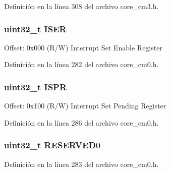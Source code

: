 Definición en la línea 308 del archivo core\+\_\+cm3.\+h.

\subsubsection[{\texorpdfstring{I\+S\+ER}{ISER}}]{ uint32\+\_\+t I\+S\+ER}\hypertarget{struct_n_v_i_c___type_a95686b1da7037feece357d91ba5f5325}{}\label{struct_n_v_i_c___type_a95686b1da7037feece357d91ba5f5325}
Offset\+: 0x000 (R/W) Interrupt Set Enable Register 

Definición en la línea 282 del archivo core\+\_\+cm0.\+h.

\subsubsection[{\texorpdfstring{I\+S\+PR}{ISPR}}]{ uint32\+\_\+t I\+S\+PR}\hypertarget{struct_n_v_i_c___type_ae3434eff1b1db4ce857c73a4ef1af273}{}\label{struct_n_v_i_c___type_ae3434eff1b1db4ce857c73a4ef1af273}
Offset\+: 0x100 (R/W) Interrupt Set Pending Register 

Definición en la línea 286 del archivo core\+\_\+cm0.\+h.

\subsubsection[{\texorpdfstring{R\+E\+S\+E\+R\+V\+E\+D0}{RESERVED0}}]{\setlength{\rightskip}{0pt plus 5cm}uint32\+\_\+t R\+E\+S\+E\+R\+V\+E\+D0}\hypertarget{struct_n_v_i_c___type_a148e6e212dc15628998e8f4239290665}{}\label{struct_n_v_i_c___type_a148e6e212dc15628998e8f4239290665}


Definición en la línea 283 del archivo core\+\_\+cm0.\+h.

